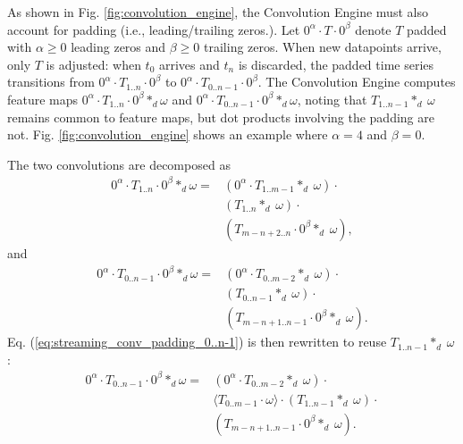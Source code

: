 As shown in Fig. \ref{fig:convolution_engine}, the Convolution Engine must also account for padding (i.e., leading/trailing zeros.). Let $0^\alpha \cdot T \cdot 0^\beta$ denote $T$ padded with $\alpha \geq0$ leading zeros and $\beta \geq 0$ trailing zeros. When new datapoints arrive, only $T$ is adjusted: when $t_0$ arrives and $t_n$ is discarded, the padded time series transitions from $0^\alpha \cdot T_{1..n} \cdot 0^\beta$ to $0^\alpha \cdot T_{0..n-1} \cdot 0^\beta$. The Convolution Engine computes feature maps $0^\alpha \cdot  T_{1..n} \cdot 0^\beta *_d \omega$ and $0^\alpha \cdot T_{0..n-1} \cdot 0^\beta *_d \omega$, noting that $T_{1..n-1} *_d\ \omega$ remains common to feature maps, but dot products involving the padding are not. Fig. \ref{fig:convolution_engine} shows an example where $\alpha = 4$ and $\beta = 0$. 

The two convolutions are decomposed as
\begin{equation}
\begin{aligned}
    0^\alpha \cdot T_{1..n} \cdot 0^\beta *_d \omega = &(0^\alpha \cdot T_{1..m-1} *_d\ \omega) \cdot \\
    &(T_{1..n} *_d\ \omega) \cdot \\
    &(T_{m-n+2..n} \cdot 0^\beta *_d\ \omega),
    \label{eq:streaming_conv_padding_1..n}
\end{aligned}
\end{equation}
and
\begin{equation}
\begin{aligned}
    0^\alpha \cdot T_{0..n-1} \cdot 0^\beta *_d \omega = &(0^\alpha \cdot T_{0..m-2} *_d\ \omega) \cdot \\
    &(T_{0..n-1} *_d\ \omega) \cdot \\
    &(T_{m-n+1..n-1} \cdot 0^\beta *_d\ \omega).
    \label{eq:streaming_conv_padding_0..n-1}
\end{aligned}
\end{equation}
Eq. (\ref{eq:streaming_conv_padding_0..n-1}) is then rewritten to reuse $T_{1..n-1} *_d\ \omega$:
\begin{equation}
\begin{aligned}
    0^\alpha \cdot T_{0..n-1} \cdot 0^\beta *_d \omega = &(0^\alpha \cdot T_{0..m-2} *_d\ \omega) \cdot \\
    &\langle T_{0..m-1} \cdot \omega\rangle \cdot (T_{1..n-1} *_d\ \omega) \cdot \\
    &(T_{m-n+1..n-1} \cdot 0^\beta *_d\ \omega).
    \label{eq:streaming_conv_padding_0..n-1_rewrite}
\end{aligned}
\end{equation}

